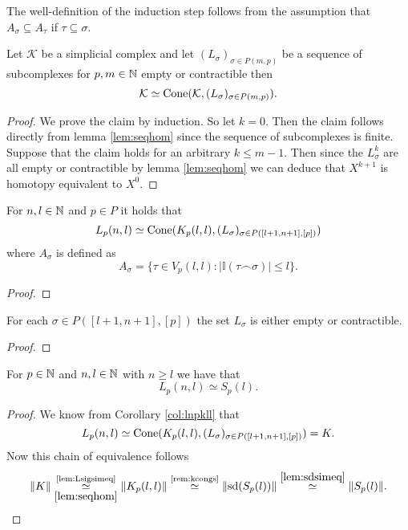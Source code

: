 The well-definition of the induction step follows from the assumption that $A_\sigma \subseteq A_\tau$ if $\tau \subseteq \sigma$.

\begin{lemma}
  Let $\mathcal{K}$ be a simplicial complex and let $(L_\sigma)_{\sigma \in P(m,p)}$ be a sequence of subcomplexes for $p,m \in \mathbb{N}$ empty or contractible then \[\mathcal{K} \simeq {\rm Cone}(\mathcal{K}, (L_\sigma)_{\sigma \in P(m,p)}).\]  
\end{lemma}

\begin{proof}
  We prove the claim by induction. So let $k = 0$. Then the claim follows directly from lemma \ref{lem:seqhom} since the sequence of subcomplexes is finite.
  Suppose that the claim holds for an arbitrary $k \leq m - 1$. Then since the $L^k_\sigma$ are all empty or contractible by lemma \ref{lem:seqhom} we can deduce that $X^{k+1}$ is homotopy equivalent to $X^0$.
\end{proof}

\begin{col}\label{col:lnpkll}
  For $n,l \in \mathbb{N}$ and $p \in P$ it holds that \[L_p(n,l) \simeq {\rm Cone}(K_p(l,l), (L_\sigma)_{\sigma \in P([l+1,n+1],[p])})\]where $A_\sigma$ is defined as \[A_\sigma = \{\tau\in V_p(l,l)\colon \left|\mathbb{I}(\tau\frown\sigma)\right| \leq l\}.\]
\end{col}

\begin{proof}
  
\end{proof}

\begin{lemma}\label{lem:Lsigsimeq}
  For each $\sigma \in P([l+1,n+1], [p])$ the set $L_\sigma$ is either empty or contractible.
\end{lemma}


\begin{proof}
  
\end{proof}

\begin{col}
  For $p \in \mathbb{N}$ and $n,l\in \mathbb{N}$ with $n \geq l$ we have that \[L_p(n,l) \simeq S_p(l).\]
\end{col}

\begin{proof}
  We know from Corollary \ref{col:lnpkll} that \[L_p(n,l) \simeq {\rm Cone}(K_p(l,l), (L_\sigma)_{\sigma\in P([l+1,n+1],[p])}) = K.\] Now this chain of equivalence follows
  \begin{equation*}
    \lVert K \rVert \underset{\ref{lem:seqhom}}{\overset{\text{\ref{lem:Lsigsimeq}}}{\simeq}} \lVert K_p(l,l) \rVert \overset{\text{\ref{rem:kcongs}}}{\simeq} \lVert {\rm sd}(S_p(l)) \rVert \overset{\ref{lem:sdsimeq}}{\simeq} \lVert S_p(l) \rVert.
  \end{equation*}
\end{proof}

